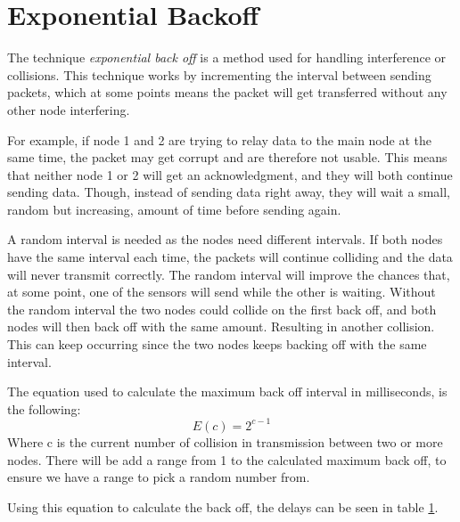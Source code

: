 \section{Exponential Backoff}\label{cha:expbackoff}
The technique \textit{exponential back off} is a method used for handling interference or collisions. This technique works by incrementing the interval between sending packets, which at some points means the packet will get transferred without any other node interfering. 

For example, if node 1 and 2 are trying to relay data to the main node at the same time, the packet may get corrupt and are therefore not usable. This means that neither node 1 or 2 will get an acknowledgment, and they will both continue sending data. Though, instead of sending data right away, they will wait a small, random but increasing, amount of time before sending again.

A random interval is needed as the nodes need different intervals. If both nodes have the same interval each time, the packets will continue colliding and the data will never transmit correctly. The random interval will improve the chances that, at some point, one of the sensors will send while the other is waiting. 
Without the random interval the two nodes could collide on the first back off, and both nodes will then back off with the same amount. Resulting in another collision. This can keep occurring since the two nodes keeps backing off with the same interval.

The equation used to calculate the maximum back off interval in milliseconds, is the following:
\begin{equation}
E(c)=2^{c-1}
\end{equation}
Where c is the current number of collision in transmission between two or more nodes.
There will be add a range from 1 to the calculated maximum back off, to ensure we have a range to pick a random number from.

Using this equation to calculate the back off, the delays can be seen in table \ref{cha:expbackoff}.

